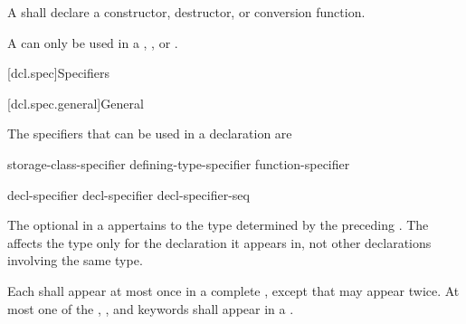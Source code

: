 \pnum
A  shall declare a
constructor, destructor, or conversion function.
\begin{note}
A  can only be used in a
,
, or
.
\end{note}

[dcl.spec]{Specifiers}%

[dcl.spec.general]{General}%

\pnum
{}%
The specifiers that can be used in a declaration are
\begin{bnf}
\br
    storage-class-specifier\br
    defining-type-specifier\br
    function-specifier\br
    \br
    \br
    \br
    \br
    \br
\end{bnf}

\begin{bnf}
\br
    decl-specifier \br
    decl-specifier decl-specifier-seq
\end{bnf}

The optional  in a 
appertains to the type determined by the preceding
. The 
affects the type only for the declaration it appears in, not other declarations involving the
same type.

\pnum
Each 
shall appear at most once in a complete ,
except that  may appear twice.
At most one of
the , , and  keywords
shall appear in a .

